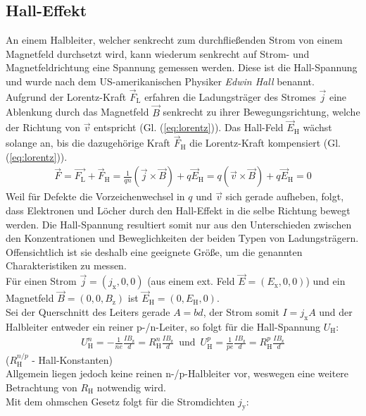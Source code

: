 \documentclass[numbers=noenddot,14pt,a4paper]{scrartcl}
\newcommand{\ix}[1]{_\text{#1}}
\newcommand{\tilt}[1]{\textit{#1}}
\begin{document}
\subsection{Hall-Effekt}
An einem Halbleiter, welcher senkrecht zum durchfließenden Strom von einem Magnetfeld durchsetzt wird, kann wiederum senkrecht auf Strom- und Magnetfeldrichtung eine Spannung gemessen werden. Diese ist die Hall-Spannung und wurde nach dem US-amerikanischen Physiker \tilt{Edwin Hall} benannt.\\
Aufgrund der Lorentz-Kraft $\vec{F}\ix{L}$ erfahren die Ladungsträger des Stromes $\vec{j}$ eine Ablenkung durch das Magnetfeld $\vec{B}$ senkrecht zu ihrer Bewegungsrichtung, welche der Richtung von $\vec{v}$ entspricht (Gl. (\ref{eq:lorentz})). Das Hall-Feld $\vec{E}\ix{H}$ wächst solange an, bis die dazugehörige Kraft $\vec{F}\ix{H}$ die Lorentz-Kraft kompensiert (Gl.(\ref{eq:lorentz})).
\begin{align}
	\vec{F}=\vec{F\ix{L}}+\vec{F}\ix{H}=\frac{1}{qn}\left(\vec{j}\times\vec{B}\right)+q\vec{E}\ix{H}=q\left(\vec{v}\times\vec{B}\right)+q\vec{E}\ix{H}=0 \label{eq:lorentz}
\end{align}
Weil für Defekte die Vorzeichenwechsel in $q$ und $\vec{v}$ sich gerade aufheben, folgt, dass Elektronen und Löcher durch den Hall-Effekt in die selbe Richtung bewegt werden. Die Hall-Spannung resultiert somit nur aus den Unterschieden zwischen den Konzentrationen und Beweglichkeiten der beiden Typen von Ladungsträgern. Offensichtlich ist sie deshalb eine geeignete Größe, um die genannten Charakteristiken zu messen.\\
Für einen Strom $\vec{j}=\left(j\ix{x},0,0\right)$ (aus einem ext. Feld $\vec{E}=\left(E\ix{x},0,0\right)$) und ein Magnetfeld $\vec{B}=\left(0,0,B\ix{z}\right)$ ist $\vec{E}\ix{H}=\left(0,E\ix{H},0\right)$.\\
Sei der Querschnitt des Leiters gerade $A=bd$, der Strom somit $I=j\ix{x}A$ und der Halbleiter entweder ein reiner p-/n-Leiter, so folgt für die Hall-Spannung $U\ix{H}$:
\begin{align}
U^n\ix{H}=-\frac{1}{ne}\frac{IB\ix{z}}{d}=R\ix{H}^n\frac{IB\ix{z}}{d} \,\,\, \text{und} \,\,\, U^p\ix{H}=\frac{1}{pe}\frac{IB\ix{z}}{d}=R\ix{H}^p\frac{IB\ix{z}}{d}
\end{align}
($R\ix{H}^{n/p}$ - Hall-Konstanten)\\
Allgemein liegen jedoch keine reinen n-/p-Halbleiter vor, weswegen eine weitere Betrachtung von $R\ix{H}$ notwendig wird.\\
Mit dem ohmschen Gesetz folgt für die Stromdichten $j\ix{y}$:
\end{document}
